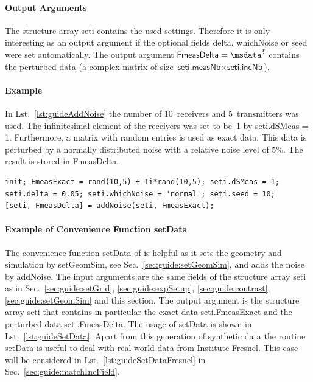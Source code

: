 \documentclass[a4paper]{article}
\begin{document}
\paragraph{Output Arguments} The structure array \textsf{seti} contains the used settings. Therefore it is only interesting as an output argument if the optional fields \textsf{delta}, \textsf{whichNoise} or \textsf{seed} were set automatically. The output argument $\textsf{FmeasDelta} = \msdata^\delta$ contains the perturbed data (a complex matrix of size $\textsf{seti.measNb} \times \textsf{seti.incNb}$).

\paragraph{Example} In Lst.~\ref{lst:guideAddNoise} the number of 10~receivers and 5~transmitters was used. The infinitesimal element of the receivers was set to be~1 by \textsf{seti.dSMeas = 1}. Furthermore, a matrix with random entries is used as exact data. This data is perturbed by a normally distributed noise with a relative noise level of $5\%$. The result is stored in \textsf{FmeasDelta}.

\begin{lstlisting}[caption={Adding noise to exact data (\emph{source code}: \textsf{guides/guideAddNoise.m}).},label=lst:guideAddNoise]
init; FmeasExact = rand(10,5) + 1i*rand(10,5); seti.dSMeas = 1;
seti.delta = 0.05; seti.whichNoise = 'normal'; seti.seed = 10;
[seti, FmeasDelta] = addNoise(seti, FmeasExact);
\end{lstlisting}

\paragraph{Example of Convenience Function \textsf{setData}} The convenience function \textsf{setData} of \IPscatt is helpful as it sets the geometry and simulation by \textsf{setGeomSim}, see Sec.~\ref{sec:guide:setGeomSim}, and adds the noise by \textsf{addNoise}.
%
The input arguments are the same fields of the structure array \textsf{seti} as in Sec.~\ref{sec:guide:setGrid}, \ref{sec:guide:expSetup}, \ref{sec:guide:contrast}, \ref{sec:guide:setGeomSim} and this section.
%
The output argument is the structure array \textsf{seti} that contains in particular the exact data \textsf{seti.FmeasExact} and the perturbed data \textsf{seti.FmeasDelta}. 
%
The usage of \textsf{setData} is shown in Lst.~\ref{lst:guideSetData}. Apart from this generation of synthetic data the routine \textsf{setData} is useful to deal with real-world data from Institute Fresnel. This case will be considered in Lst.~\ref{lst:guideSetDataFresnel} in Sec.~\ref{sec:guide:matchIncField}.
\end{document}
